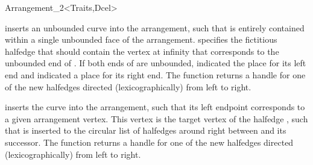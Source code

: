 \begin{ccRefClass}{Arrangement_2<Traits,Dcel>}
\begin{ccAdvanced}
  {inserts an unbounded curve  into the arrangement, such that 
   is entirely contained within a single unbounded face of the arrangement.
    specifies the fictitious halfedge that should contain the
   vertex at infinity that corresponds to the unbounded end of . If
   both ends of  are unbounded,  indicated the place
   for its left end and  indicated a place for its right end.  
   The function returns a handle for one of the new halfedges directed
   (lexicographically) from left to right.
   }

  {inserts the curve  into the arrangement, such that its left
   endpoint corresponds to a given arrangement vertex. This vertex is the
   target vertex of the halfedge , such that  is inserted
   to the circular list of halfedges around  right
   between  and its successor. The function returns a handle for
   one of the new halfedges directed (lexicographically) from left to right.
   }


\end{ccAdvanced}
\end{ccRefClass}

